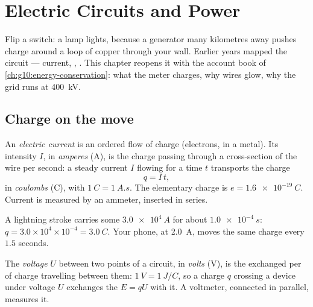 \chapter{Electric Circuits and Power}\label{ch:g11:circuits-and-power}

Flip a switch: a lamp lights, because a generator many kilometres away
pushes charge around a loop of copper through your wall. Earlier years
mapped the circuit --- current, , . This chapter reopens
it with the account book of \cref{ch:g10:energy-conservation}: what the
meter charges, why  wires glow, why the grid runs at \qty{400}{kV}.

\section{Charge on the move}

\begin{definition}\label{def:g11:circuits-and-power:current}
An \emph{electric current} is an ordered flow of
charge (electrons, in a metal). Its intensity $I$, in
\emph{amperes} (\unit{A}), is the charge passing through a
cross-section of the wire per second: a steady current $I$ flowing for a
time $t$ transports the charge
\[ q = I\,t , \]
in \emph{coulombs} (\unit{C}), with $\qty{1}{C} =
\qty{1}{A.s}$. The elementary charge is $e = \qty{1.6e-19}{C}$. Current
is measured by an ammeter, inserted in series.
\end{definition}

\begin{example}\label{ex:g11:circuits-and-power:coulomb}
A lightning stroke carries some $\qty{3.0e4}{A}$ for about
$\qty{1.0e-4}{s}$: $q = 3.0\times10^{4} \times 10^{-4} = \qty{3.0}{C}$.
Your phone, at \qty{2.0}{A}, moves the same charge every $1.5$ seconds.
\end{example}

\begin{definition}\label{def:g11:circuits-and-power:voltage}
The \emph{voltage} $U$ between two points of a circuit, in
\emph{volts} (\unit{V}), is the  exchanged per  of
charge travelling between them: $\qty{1}{V} = \qty{1}{J/C}$, so a charge
$q$ crossing a device under voltage $U$ exchanges the  $E = qU$
with it. A voltmeter, connected in parallel, measures it.
\end{definition}

